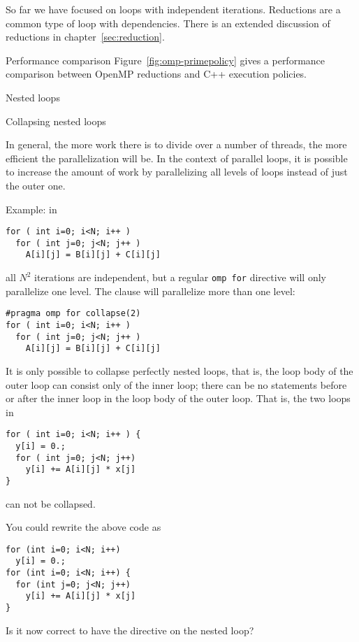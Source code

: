 So far we have focused on loops with independent iterations.
Reductions are a common type of loop with dependencies.
There is an extended discussion of reductions in chapter~\ref{sec:reduction}.

\begin{cppnote}{Performance comparison}
  Figure~\ref{fig:omp-primepolicy} gives a performance comparison between
  OpenMP reductions and C++ execution policies.
\end{cppnote}

 {Nested loops}

 {Collapsing nested loops}

In general, the more work there is to divide over a number of threads,
the more efficient the parallelization will be. In the context of
parallel loops, it is possible to increase the amount of work by
parallelizing all levels of loops instead of just the outer one.

Example: in
\begin{lstlisting}[language=omp]
for ( int i=0; i<N; i++ )
  for ( int j=0; j<N; j++ )
    A[i][j] = B[i][j] + C[i][j] 
\end{lstlisting}
all $N^2$ iterations are independent, but a regular \lstinline[language=omp]{omp for}
directive will only parallelize one level. The 
clause will parallelize more than one level:
\begin{lstlisting}[language=omp]
#pragma omp for collapse(2)
for ( int i=0; i<N; i++ )
  for ( int j=0; j<N; j++ )
    A[i][j] = B[i][j] + C[i][j] 
\end{lstlisting}
It is only possible to collapse perfectly nested loops, that is, the
loop body of the outer loop can consist only of the inner loop; there
can be no statements before or after the inner loop in the loop body
of the outer loop. That is, the two loops in
\begin{lstlisting}[language=omp]
for ( int i=0; i<N; i++ ) {
  y[i] = 0.;
  for ( int j=0; j<N; j++)
    y[i] += A[i][j] * x[j]
}
\end{lstlisting}
can not be collapsed.

\begin{exercise}
  You could rewrite the above code as
\begin{lstlisting}[language=omp]
for (int i=0; i<N; i++)
  y[i] = 0.;
for (int i=0; i<N; i++) {
  for (int j=0; j<N; j++)
    y[i] += A[i][j] * x[j]
}
\end{lstlisting}
Is it now correct to have the  directive
on the nested loop?
\end{exercise}


